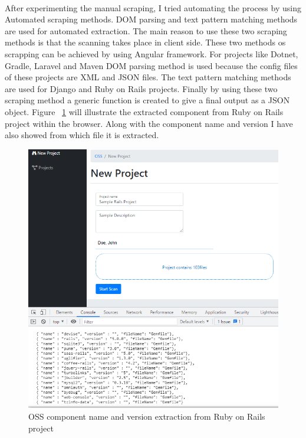 \paragraph{}
After experimenting the manual scraping, I tried automating the process by using Automated scraping methods. \acs{DOM} parsing and text pattern matching methods are used for automated extraction. The main reason to use these two scraping methods is that the scanning takes place in client side. These two methods os scrapping can be achieved by using Angular framework. For projects like Dotnet, Gradle, Laravel and Maven \acs{DOM} parsing method is used because the config files of these projects are \acs{XML} and \acs{JSON} files. The text pattern matching methods are used for Django and Ruby on Rails projects. Finally by using these two scraping method a generic function is created to give a final output as a \acs{JSON} object. Figure ~\ref{fig:clientOutput} will illustrate the extracted component from Ruby on Rails project within the browser. Along with the component name and version I have also showed from which file it is extracted. 
\newpage
\begin{figure}[H]
	\includegraphics[width=15cm]{includes/clientOutput.PNG}
	\centering
	\caption{\acs{OSS} component name and version extraction from Ruby on Rails project}
	\label{fig:clientOutput}
\end{figure}

